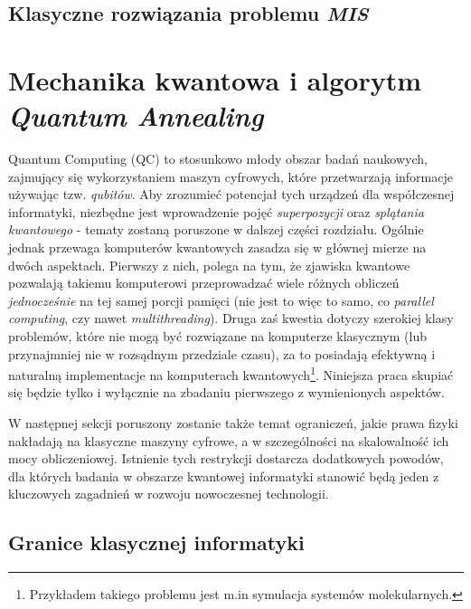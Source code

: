 \documentclass[12pt,a4paper,twoside,openany]{book}
\begin{document}
\section{Klasyczne rozwiązania problemu \textit{MIS}}

\chapter{Mechanika kwantowa i algorytm \textit{Quantum Annealing}}

Quantum Computing (QC) to stosunkowo młody obszar badań naukowych, zajmujący się wykorzystaniem maszyn cyfrowych, które przetwarzają informacje używając tzw. \textit{qubitów}. Aby zrozumieć potencjał tych urządzeń dla współczesnej informatyki, niezbędne jest wprowadzenie pojęć \textit{superpozycji} oraz \textit{splątania kwantowego} - tematy zostaną poruszone w dalszej części rozdziału. Ogólnie jednak przewaga komputerów kwantowych zasadza się w głównej mierze na dwóch aspektach. Pierwszy z nich, polega na tym, że zjawiska kwantowe pozwalają takiemu komputerowi przeprowadzać wiele różnych obliczeń \textit{jednocześnie} na tej samej porcji pamięci (nie jest to więc to samo, co \textit{parallel computing}, czy nawet \textit{multithreading}). Druga zaś kwestia dotyczy szerokiej klasy problemów, które nie mogą być rozwiązane na komputerze klasycznym (lub przynajmniej nie w rozsądnym przedziale czasu), za to posiadają efektywną i naturalną implementacje na komputerach kwantowych\footnote{Przykładem takiego problemu jest m.in symulacja systemów molekularnych.}. Niniejsza praca skupiać się będzie tylko i wyłącznie na zbadaniu pierwszego z wymienionych aspektów.

W następnej sekcji poruszony zostanie także temat ograniczeń, jakie prawa fizyki nakładają na klasyczne maszyny cyfrowe, a w szczególności na skalowalność ich mocy obliczeniowej. Istnienie tych restrykcji dostarcza dodatkowych powodów, dla których badania w obszarze kwantowej informatyki stanowić będą jeden z kluczowych zagadnień w rozwoju nowoczesnej technologii.



\section{Granice klasycznej informatyki}
\end{document}
